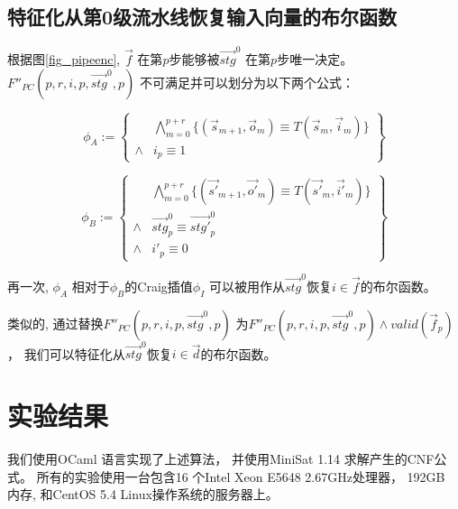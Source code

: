 \subsection{特征化从第0级流水线恢复输入向量的布尔函数}

根据图\ref{fig_pipeenc},
$\vec{f}$ 在第$p$步能够被$\vec{stg}^0$ 在第$p$步唯一决定。
$F''_{PC}(p,r,i,p,\vec{stg}^0,p)$ 不可满足并可以划分为以下两个公式：

\begin{equation}
\phi_A:=
\left\{
\begin{array}{cc}
&\bigwedge_{m=0}^{p+r}
\{
(\vec{s}_{m+1},\vec{o}_m)\equiv T(\vec{s}_m,\vec{i}_m)
\}
\\
\wedge& i_{p}\equiv 1
\end{array}
\right\}
\end{equation}

\begin{equation}
\phi_B:=
\left\{
\begin{array}{cc}
&\bigwedge_{m=0}^{p+r}
\{
(\vec{s'}_{m+1},\vec{o'}_m)\equiv T(\vec{s'}_m,\vec{i'}_m)
\}
\\
\wedge&\vec{stg}^0_p\equiv \vec{stg'}^0_p \\
\wedge& i'_{p}\equiv 0
\end{array}
\right\}
\end{equation}

再一次,
$\phi_A$ 相对于$\phi_B$的Craig插值$\phi_I$
可以被用作从$\vec{stg}^0$恢复$i\in\vec{f}$的布尔函数。

类似的,
通过替换$F''_{PC}(p,r,i,p,\vec{stg}^0,p)$ 为$F''_{PC}(p,r,i,p,\vec{stg}^0,p)\wedge valid(\vec{f}_p)$，
我们可以特征化从$\vec{stg}^0$恢复$i\in\vec{d}$的布尔函数。



\section{实验结果}\label{sec_exp}
我们使用OCaml 语言实现了上述算法，
并使用MiniSat 1.14 \cite{EXTSAT}求解产生的CNF公式。
所有的实验使用一台包含16 个Intel Xeon E5648 2.67GHz处理器，
192GB 内存, 和CentOS 5.4 Linux操作系统的服务器上。

